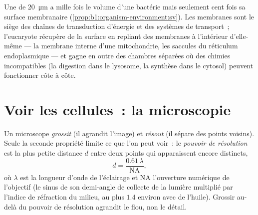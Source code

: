 \begin{example}\label{ex:b1:cell-unit-of-life:whycompart}
Une  de \qty{20}{\micro m} a mille fois le volume d'une bactérie
mais seulement cent fois sa surface membranaire
(\cref{prop:b1:organism-environment:sv}). Les membranes sont le siège
des chaînes de transduction d'énergie et des systèmes de transport~;
l'eucaryote récupère de la surface en repliant des membranes à
l'intérieur d'elle-même --- la membrane interne d'une mitochondrie, les
saccules du réticulum endoplasmique --- et gagne en outre des chambres
séparées où des chimies incompatibles (la digestion dans le lysosome, la
synthèse dans le cytosol) peuvent fonctionner côte à côte.
\end{example}

\section{Voir les cellules~: la microscopie}

\begin{definition}\label{def:b1:cell-unit-of-life:resolution}
Un microscope \emph{grossit} (il agrandit l'image)
et \emph{résout} (il sépare des points voisins). Seule
la seconde propriété limite ce que l'on peut voir~: le \emph{pouvoir de
résolution} est la plus petite distance $d$
entre deux points qui apparaissent encore distincts,
\[
d = \frac{0.61\,\lambda}{\mathrm{NA}},
\]
où $\lambda$ est la longueur d'onde de l'éclairage et $\mathrm{NA}$
l'ouverture numérique de l'objectif (le sinus de son demi-angle de
collecte de la lumière multiplié par l'indice de réfraction du milieu,
au plus $1.4$ environ avec de l'huile). Grossir au-delà du pouvoir de
résolution agrandit le flou, non le détail.
\end{definition}

